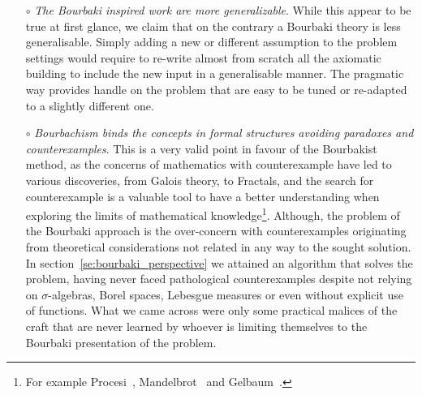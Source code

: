 \documentclass[]{scrartcl}
\theoremstyle{definition}
\begin{document}
\begin{itemize}
    The advocates of the superiority of pure mathematics\footnote{
        It is worth noticing that the academic dichotomy pure/applied maths is something that can not be found in mathematics before Bourbaki. The reader is invited to classify any of the work of Archimedes, Gauss, Euler or any other great names in the history of pre-modern mathematics as pure or applied mathematics with no ambiguities.
    } have even arrived at accusing the mathematics that has anything to do with reality of being more prone of making mistakes\footnote{
        Gros~\cite{gros2019masters} had found how even professional mathematicians can be mislead by reality. And they had leveraged on this most surprising fact, for advocating to increase the detachment. After concluding that \lq\lq [...] we can't reason in a totally abstract manner\rq\rq, instead of suggesting to take into account the reality in the mathematical practice they suggested a move towards the opposite direction: \lq\lq We have to detach ourselves from our non-mathematical intuition\rq\rq~\cite{gros2019sciencedaily}.
    }. We can be reassured by the fact that under every circumstance, the reality is adamant to persist in being what it is, and it is at this point an interesting exercise to imagine someone advocating for having medicine and engineering detached from reality.

    \item[$\circ$] \emph{The Bourbaki inspired work are more generalizable}. While this appear to be true at first glance, we claim that on the contrary a Bourbaki theory is less generalisable. Simply adding a new or different assumption to the problem settings would require to re-write almost from scratch all the axiomatic building to include the new input in a generalisable manner. The pragmatic way provides handle on the problem that are easy to be tuned or re-adapted to a slightly different one.
    
    \item[$\circ$] \emph{Bourbachism binds the concepts in formal structures avoiding paradoxes and counterexamples}. This is a very valid point in favour of the Bourbakist method, as the concerns of mathematics with counterexample have led to various discoveries, from Galois theory, to Fractals, and the search for counterexample is a valuable tool to have a better understanding when exploring the limits of mathematical knowledge\footnote{
        For example Procesi~\cite{procesi1977elementi}, Mandelbrot~\cite{mandelbrot1983fractal} and Gelbaum~\cite{gelbaum2003counterexamples}.
    }. Although, the problem of the Bourbaki approach is the over-concern with counterexamples originating from theoretical considerations not related in any way to the sought solution. In section~\ref{se:bourbaki_perspective} we attained an algorithm that solves the problem, having never faced pathological counterexamples despite not relying on $\sigma$-algebras, Borel spaces, Lebesgue measures or even without explicit use of functions. What we came across were only some practical malices of the craft that are never learned by whoever is limiting themselves to the Bourbaki presentation of the problem.

\end{itemize}
\end{document}
